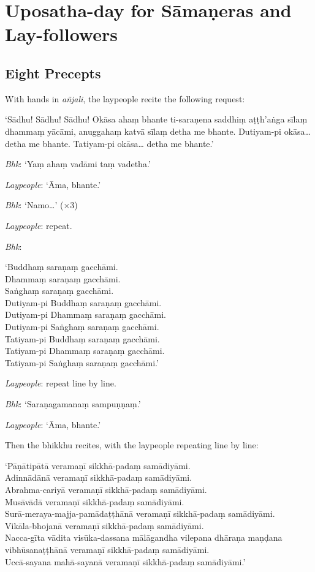\section{Uposatha-day for Sāmaṇeras and Lay-followers}

\subsection{Eight Precepts}

With hands in \emph{añjali}, the laypeople recite the following request:

‘Sādhu! Sādhu! Sādhu! Okāsa ahaṃ bhante ti-saraṇena saddhiṃ aṭṭh'aṅga sīlaṃ
dhammaṃ yācāmi, anuggahaṃ katvā sīlaṃ detha me bhante. Dutiyam-pi okāsa… detha
me bhante. Tatiyam-pi okāsa… detha me bhante.’

\emph{Bhk}: ‘Yaṃ ahaṃ vadāmi taṃ vadetha.’

\emph{Laypeople}: ‘Āma, bhante.’

\emph{Bhk}: ‘Namo…’ (×3)

\emph{Laypeople}: repeat.

\emph{Bhk}:

‘Buddhaṃ saraṇaṃ gacchāmi.\\
Dhammaṃ saraṇaṃ gacchāmi.\\
Saṅghaṃ saraṇaṃ gacchāmi.\\
Dutiyam-pi Buddhaṃ saraṇaṃ gacchāmi.\\
Dutiyam-pi Dhammaṃ saraṇaṃ gacchāmi.\\
Dutiyam-pi Saṅghaṃ saraṇaṃ gacchāmi.\\
Tatiyam-pi Buddhaṃ saraṇaṃ gacchāmi.\\
Tatiyam-pi Dhammaṃ saraṇaṃ gacchāmi.\\
Tatiyam-pi Saṅghaṃ saraṇaṃ gacchāmi.’

\emph{Laypeople}: repeat line by line.

\emph{Bhk}: ‘Saraṇagamanaṃ sampuṇṇaṃ.’

\emph{Laypeople}: ‘Āma, bhante.’

Then the bhikkhu recites, with the laypeople repeating line by line:

‘Pāṇātipātā veramaṇī sikkhā-padaṃ samādiyāmi.\\
Adinnādānā veramaṇī sikkhā-padaṃ samādiyāmi.\\
Abrahma-cariyā veramaṇī sikkhā-padaṃ samādiyāmi.\\
Musāvādā veramaṇī sikkhā-padaṃ samādiyāmi.\\
Surā-meraya-majja-pamādaṭṭhānā veramaṇī sikkhā-padaṃ samādiyāmi.\\
Vikāla-bhojanā veramaṇī sikkhā-padaṃ samādiyāmi.\\
Nacca-gīta vādita visūka-dassana mālāgandha vilepana dhāraṇa maṇḍana
vibhūsanaṭṭhānā veramaṇī sikkhā-padaṃ samādiyāmi.\\
Uccā-sayana mahā-sayanā veramaṇī sikkhā-padaṃ samādiyāmi.’

